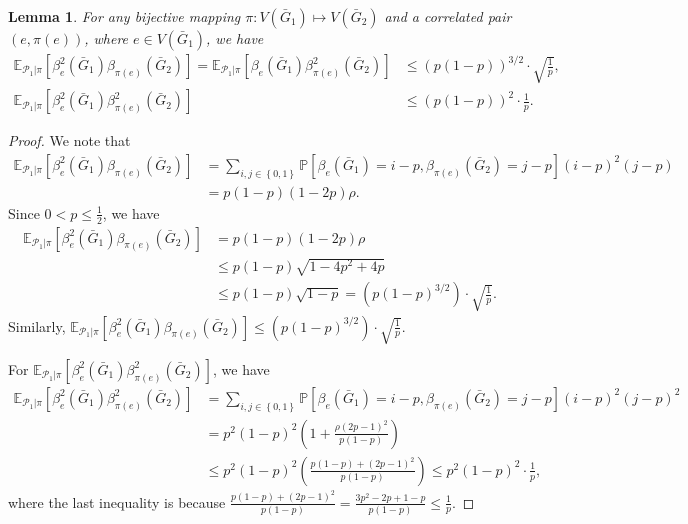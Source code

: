 \documentclass[letterpaper,11pt]{article}
\newtheorem{lemma}{Lemma}
\theoremstyle{definition}
\newcommand{\maP}{\mathcal{P}}
\newcommand{\prob}[1]{ \mathbb{P}\left[ #1 \right] }
\newcommand{\pth}[1]{\left( #1 \right)}
\newcommand{\qth}[1]{\left[ #1 \right]}
\newcommand{\sth}[1]{\left\{ #1 \right\}}
\def\E{\mathbb{E}}
\begin{document}
\begin{lemma}\label{lem:moment-bound}
    For any bijective mapping $\pi:V(\bar{G}_1)\mapsto V(\bar{G}_2)$ and a correlated pair $(e,\pi(e))$, where $e\in V(\bar{G}_1)$, we have \begin{align*}
        \E_{\maP_1|\pi} \qth{\beta_e^2(\bar{G}_1) \beta_{\pi(e)}(\bar{G}_2)} = \E_{\maP_1|\pi} \qth{\beta_e(\bar{G}_1) \beta_{\pi(e)}^2(\bar{G}_2)}&\le \pth{p(1-p)}^{3/2}\cdot \sqrt{\frac{1}{p}},\\
        \E_{\maP_1|\pi}\qth{\beta_e^2(\bar{G}_1) \beta_{\pi(e)}^2(\bar{G}_2)}&\le (p(1-p))^2\cdot \frac{1}{p}. 
    \end{align*}
\end{lemma}

\begin{proof}
    We note that \begin{align*}
        \E_{\maP_1|\pi} \qth{\beta_e^2(\bar{G}_1) \beta_{\pi(e)}(\bar{G}_2)} &= \sum_{i,j\in \sth{0,1}} \prob{\beta_e(\bar{G}_1) = i-p,\beta_{\pi(e)}(\bar{G}_2) = j-p} (i-p)^2 (j-p)\\
        &=p(1-p)(1-2p)\rho.
    \end{align*}
    Since $0<p\le \frac{1}{2}$, we have \begin{align*}
        \E_{\maP_1|\pi} \qth{\beta_e^2(\bar{G}_1) \beta_{\pi(e)}(\bar{G}_2)} &=p(1-p)(1-2p)\rho\\&\le p(1-p)\sqrt{1-4p^2+4p}\\
        &\le p(1-p)\sqrt{1-p} = \pth{p(1-p)^{3/2}}\cdot \sqrt{\frac{1}{p}}.
    \end{align*}
    Similarly, $\E_{\maP_1|\pi} \qth{\beta_e^2(\bar{G}_1) \beta_{\pi(e)}(\bar{G}_2)}\le \pth{p(1-p)^{3/2}}\cdot \sqrt{\frac{1}{p}}$.

    For $\E_{\maP_1|\pi}\qth{\beta_e^2(\bar{G}_1) \beta_{\pi(e)}^2(\bar{G}_2)}$, we have \begin{align*}
        \E_{\maP_1|\pi}\qth{\beta_e^2(\bar{G}_1) \beta_{\pi(e)}^2(\bar{G}_2)} &= \sum_{i,j\in \sth{0,1}} \prob{\beta_e(\bar{G}_1) = i-p,\beta_{\pi(e)}(\bar{G}_2) = j-p} (i-p)^2 (j-p)^2\\
        &=p^2(1-p)^2\pth{1+\frac{\rho (2p-1)^2}{p(1-p)}}\\&\le p^2 (1-p)^2 \pth{\frac{p(1-p)+(2p-1)^2}{p(1-p)}}\le p^2(1-p)^2\cdot \frac{1}{p},
    \end{align*}
    where the last inequality is because $\frac{p(1-p)+(2p-1)^2}{p(1-p)}=\frac{3p^2-2p+1-p}{p(1-p)}\le \frac{1}{p}$.
\end{proof}
\end{document}
